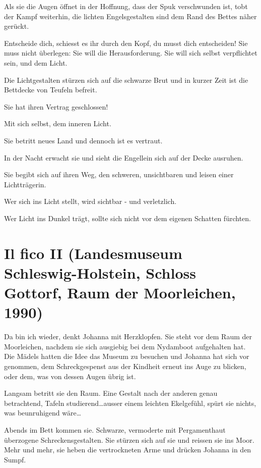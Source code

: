 \documentclass[10pt,titlepage,a5paper]{book}
\begin{document}
Als sie die Augen öffnet in der Hoffnung, dass der Spuk verschwunden ist, tobt der Kampf weiterhin, die lichten Engelsgestalten sind dem Rand des Bettes näher gerückt.

Entscheide dich, schiesst es ihr durch den Kopf, du musst dich entscheiden! Sie muss nicht überlegen: Sie will die Herausforderung. 
Sie will sich selbst verpflichtet sein, und dem Licht.

Die Lichtgestalten stürzen sich auf die schwarze Brut und in kurzer Zeit ist die Bettdecke von Teufeln befreit.

Sie hat ihren Vertrag geschlossen!

Mit sich selbst, dem inneren Licht.

Sie betritt neues  Land und dennoch ist es vertraut.

In der Nacht erwacht sie und sieht die Engellein sich auf der Decke ausruhen.

Sie begibt sich auf ihren Weg, den schweren, unsichtbaren und leisen einer Lichtträgerin.

Wer sich ins Licht stellt, wird sichtbar - und verletzlich.

Wer Licht ins Dunkel trägt, sollte sich nicht vor dem eigenen Schatten fürchten.



\section*{Il fico II (Landesmuseum Schleswig-Holstein, Schloss Gottorf, Raum der Moorleichen, 1990)}



Da bin ich wieder, denkt Johanna mit Herzklopfen. Sie steht vor dem Raum der Moorleichen, nachdem sie sich ausgiebig bei dem Nydamboot aufgehalten hat. Die Mädels hatten die Idee das Museum zu besuchen und Johanna hat sich vor genommen, dem Schreckgespenst aus der Kindheit erneut ins Auge zu blicken, oder dem, was von dessen Augen übrig ist.

Langsam betritt sie den Raum. Eine Gestalt nach der anderen genau betrachtend, Tafeln studierend\dots  ausser einem leichten Ekelgefühl, spürt sie nichts, was beunruhigend wäre\dots 

Abends im Bett kommen sie. Schwarze, vermoderte mit Pergamenthaut überzogene Schreckensgestalten. Sie stürzen sich auf sie und reissen sie ins Moor. Mehr und mehr, sie heben die vertrockneten Arme und drücken Johanna in den Sumpf.
 
\end{document}
